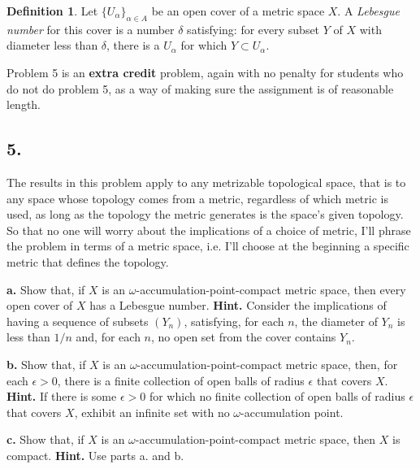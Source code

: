 \documentclass{amsart}
\theoremstyle{plain}
\theoremstyle{definition}
\newtheorem{definition}[theorem]{Definition}
\theoremstyle{remark}
\begin{document}
\vspace{.15in}
\begin{definition} Let $\{ U_{\alpha}\} _{\alpha \in A}$ be an open cover of a metric space $X$. A {\it Lebesgue number} for this cover is a number $\delta$ satisfying: for every subset $Y$ of $X$ with diameter less than $\delta$, there is a $U_{\alpha}$ for which $Y\subset U_{\alpha}$. \end{definition}

\vspace{.15in}
Problem 5 is an {\bf extra credit} problem, again with no penalty for students who do not do problem 5, as a way of making sure the assignment is of reasonable length.
 
\vspace{.15in}
\noindent
\subsection*{5.} The results in this problem apply to any metrizable topological space, that is to any space whose topology comes from a metric, regardless of which metric is used, as long as the topology the metric generates is the space's given topology. So that no one will worry about the implications of a choice of metric, I'll phrase the problem in terms of a metric space, i.e. I'll choose at the beginning a specific metric that defines the topology.  

\vspace{.1in}
\noindent
{\bfseries a.} Show that, if $X$ is an $\omega$-accumulation-point-compact metric space, then every open cover of $X$ has a Lebesgue number. {\bfseries Hint.} Consider the implications of having a sequence of subsets $(Y_n)$, satisfying, for each $n$, the diameter of $Y_n$ is less than $1/n$ and, for each $n$, no open set from the cover contains $Y_n$.  

\vspace{.1in}
\noindent
{\bfseries b.} Show that, if $X$ is an $\omega$-accumulation-point-compact metric space, then, for each $\epsilon > 0$, there is a finite collection of open balls of radius $\epsilon$ that covers $X$. {\bfseries Hint.} If there is some $\epsilon > 0$ for which no finite collection of open balls of radius $\epsilon$ that covers $X$, exhibit an infinite set with no $\omega$-accumulation point.

\vspace{.1in}
\noindent
{\bfseries c.} Show that, if $X$ is an $\omega$-accumulation-point-compact metric space, then $X$ is compact. {\bfseries Hint.} Use parts a. and b. 


 
\end{document}
